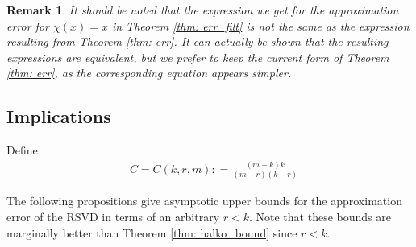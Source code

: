 \documentclass[conference]{IEEEtran}
\newtheorem{remark}{Remark}
\begin{document}
\begin{remark}

It should be noted that the expression we get for the approximation error for $\chi(x) = x$ in Theorem \ref{thm: err_filt} is not the same as the expression resulting from Theorem \ref{thm: err}. It can actually be shown that the resulting expressions are equivalent, but we prefer to keep the current form of Theorem \ref{thm: err}, as the corresponding equation appears simpler.   
    
\end{remark}

\subsection{Implications}

Define 
\begin{align*}
    & C = C(k,r,m) : = \frac{(m-k)k}{(m-r)(k-r)} 
\end{align*} 

The following propositions give asymptotic upper bounds for the approximation error of the RSVD in terms of an arbitrary $r < k$. Note that these bounds are marginally better than Theorem \ref{thm: halko_bound} since $r < k$. 
\end{document}

